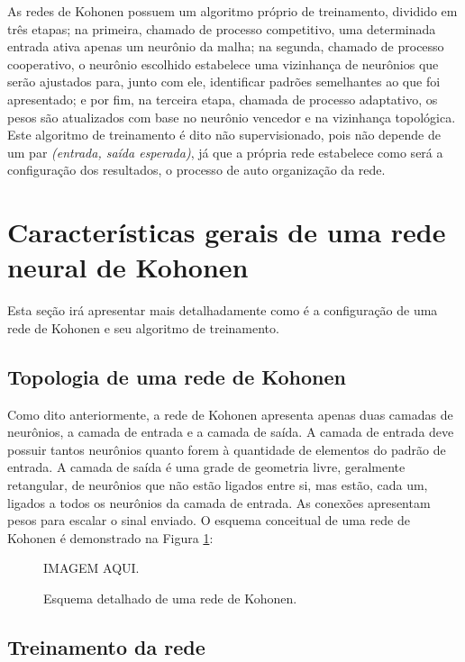 As redes de Kohonen possuem um algoritmo próprio de treinamento, dividido em
três etapas; na primeira, chamado de processo competitivo, uma determinada entrada
ativa apenas um neurônio da malha; na segunda, chamado de processo cooperativo,
o neurônio escolhido estabelece uma vizinhança de neurônios que serão ajustados
para, junto com ele, identificar padrões semelhantes ao que foi apresentado; e
por fim, na terceira etapa, chamada de processo adaptativo, os pesos são
atualizados com base no neurônio vencedor e na vizinhança topológica. Este
algoritmo de treinamento é dito não supervisionado, pois não depende de um
par \textit{(entrada, saída esperada)}, já que a própria rede estabelece como
será a configuração dos resultados, o processo de auto organização da rede.

\section{Características gerais de uma rede neural de Kohonen}\label{sec:caracteristicas_rede_kohonen}

Esta seção irá apresentar mais detalhadamente como é a configuração de uma rede
de Kohonen e seu algoritmo de treinamento.

\subsection{Topologia de uma rede de Kohonen}

Como dito anteriormente, a rede de Kohonen apresenta apenas duas camadas de
neurônios, a camada de entrada e a camada de saída. A camada de entrada deve
possuir tantos neurônios quanto forem à quantidade de elementos do padrão de
entrada. A camada de saída é uma grade de geometria livre, geralmente
retangular, de neurônios que não estão ligados entre si, mas estão, cada um,
ligados a todos os neurônios da camada de entrada. As conexões apresentam pesos
para escalar o sinal enviado. O esquema conceitual de uma rede de Kohonen é
demonstrado na Figura \ref{fig:kohonen_esquema}:

\begin{figure}[H]
  \begin{center}
    IMAGEM AQUI.
  \end{center}
  \caption{ Esquema detalhado de uma rede de Kohonen. }
  \label{fig:kohonen_esquema}
\end{figure}

\subsection{Treinamento da rede}

